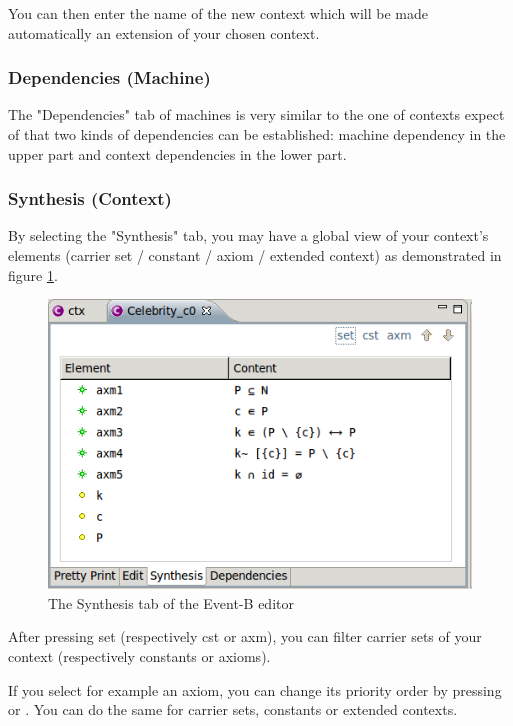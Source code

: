 You can then enter the name of the new context which will be made automatically an extension of your chosen context. 

\subsubsection{Dependencies (Machine)}

The "Dependencies" tab of machines is very similar to the one of contexts expect of that two kinds of dependencies can be established: machine dependency in the upper part and context dependencies in the lower part.

\subsubsection{Synthesis (Context)}

By selecting the "Synthesis" tab, you may have a global view of your context's elements (carrier set / constant / axiom / extended context) as demonstrated in figure \ref{fig_ref_01_eventb_editor11}. 

\begin{figure}[!h]
\begin{center}
	\includegraphics{img/reference/ref_01_eventb_editor11.png}
	\caption{The Synthesis tab of the Event-B editor}
	\label{fig_ref_01_eventb_editor11}
\end{center}
\end{figure}

After pressing set (respectively cst or axm), you can filter carrier sets of your context (respectively constants or axioms).

If you select for example an axiom, you can change its priority order by pressing  or ‎. You can do the same for carrier sets, constants or extended contexts.

